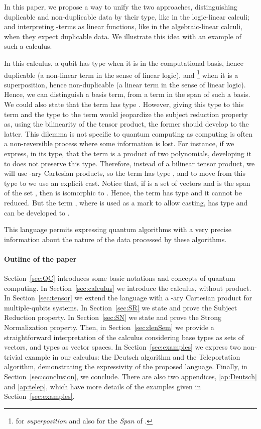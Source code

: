 \documentclass[preprint]{elsarticle}
\begin{document}
In this paper, we propose a way to unify the two approaches, distinguishing
duplicable and non-duplicable data by their type, like in the logic-linear
calculi; and interpreting -terms as linear functions, like in the
algebraic-linear calculi, when they expect duplicable data. We illustrate this
idea with an example of such a calculus.

In this calculus, a qubit has type  when it is in the computational basis,
hence duplicable (a non-linear term in the sense of linear logic), and
\footnote{ for \emph{superposition} and also for the \emph{Span} of
  .} when it is a superposition, hence non-duplicable (a linear term in the
sense of linear logic). Hence, we can distinguish a basis term, from a term in
the span of such a basis. We could also state that the term  has type . However, giving this
type to this term and the type  to the term  would jeopardize the subject
reduction property as, using the bilinearity of the tensor product, the former
should develop to the latter. This dilemma is not specific to quantum computing
as computing is often a non-reversible process where some information is lost.
For instance, if we express, in its type, that the term  is a
product of two polynomials, developing it to  does not preserve
this type. Therefore, instead of a bilinear tensor product, we will use -ary
Cartesian products, so the term  has type
, and to move from this type to  we use an
explicit cast. Notice that, if  is a set of vectors and  is the span
of the set , then  is isomorphic to .
Hence, the term  has type 
and it cannot be reduced. But the term , where  is used as a mark to allow casting, has type  and can be developed
to .

This language permits expressing quantum algorithms with a very precise
information about the nature of the data processed by these algorithms.

\paragraph*{Outline of the paper}

Section~\ref{sec:QC} introduces some basic notations and concepts of quantum computing.
In Section~\ref{sec:calculus} we introduce the calculus, without product. In
Section~\ref{sec:tensor} we extend the language with a -ary Cartesian product
for multiple-qubits systems. In Section~\ref{sec:SR} we state and prove the
Subject Reduction property. In Section~\ref{sec:SN} we state and prove the
Strong Normalization property. Then, in Section~\ref{sec:denSem} we provide a
straightforward interpretation of the calculus considering base types as sets of
vectors, and types  as vector spaces. In Section~\ref{sec:examples} we
express two non-trivial example in our calculus: the Deutsch algorithm and the
Teleportation algorithm, demonstrating the expressivity of the proposed
language. Finally, in Section~\ref{sec:conclusion}, we conclude. There are also
two appendices, \ref{ap:Deutsch} and \ref{ap:telep}, which have more details of the
examples given in Section~\ref{sec:examples}.
\end{document}
